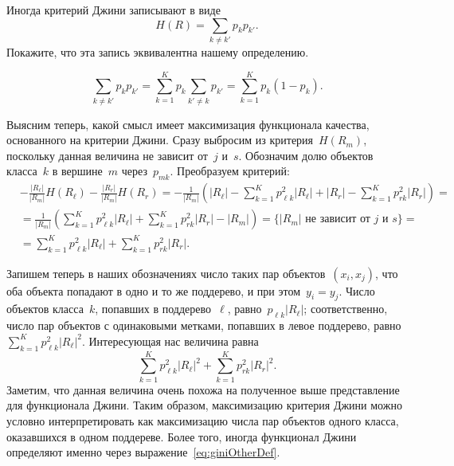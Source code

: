 \documentclass[12pt,a4paper]{article}
\begin{document}
\begin{vkProblem}
    Иногда критерий Джини записывают в виде
    \[
        H(R)
        =
        \sum_{k \neq k'}
            p_{k} p_{k'}.
    \]
    Покажите, что эта запись эквивалентна нашему определению.
\end{vkProblem}

\begin{esSolution}
    \[
        \sum_{k \neq k'} p_{k} p_{k'}
        =
        \sum_{k = 1}^{K} p_{k} \sum_{k' \neq k} p_{k'}
        =
        \sum_{k = 1}^{K} p_{k} (1 - p_{k}).
    \]
\end{esSolution}



Выясним теперь, какой смысл имеет максимизация функционала качества, основанного на критерии Джини.
Сразу выбросим из критерия~$H(R_m)$, поскольку данная величина не зависит от~$j$ и~$s$.
Обозначим долю объектов класса~$k$ в вершине~$m$ через~$p_{mk}$.
Преобразуем критерий:
\begin{align*}
    &- \frac{|R_\ell|}{|R_m|} H(R_\ell) - \frac{|R_r|}{|R_m|} H(R_r)
    =
    - \frac{1}{|R_m|} \left(
        |R_\ell| - \sum_{k = 1}^{K} p_{\ell k}^2 |R_\ell| +
        |R_r| - \sum_{k = 1}^{K} p_{r k}^2 |R_r|
    \right)
    =\\
    &=
    \frac{1}{|R_m|} \left(
        \sum_{k = 1}^{K} p_{\ell k}^2 |R_\ell| +
        \sum_{k = 1}^{K} p_{r k}^2 |R_r|
        - |R_m|
    \right)
    =
    \{\text{$|R_m|$ не зависит от~$j$ и~$s$}\}
    =\\
    &=
    \sum_{k = 1}^{K} p_{\ell k}^2 |R_\ell| +
    \sum_{k = 1}^{K} p_{r k}^2 |R_r|.
\end{align*}

Запишем теперь в наших обозначениях число таких пар объектов~$(x_i, x_j)$,
что оба объекта попадают в одно и то же поддерево, и при этом~$y_i = y_j$.
Число объектов класса~$k$, попавших в поддерево~$\ell$,
равно~$p_{\ell k} |R_\ell|$;
соответственно, число пар объектов с одинаковыми метками, попавших в левое
поддерево, равно~$\sum_{k = 1}^{K} p_{\ell k}^2 |R_\ell|^2$.
Интересующая нас величина равна
\begin{equation}
\label{eq:giniOtherDef}
    \sum_{k = 1}^{K} p_{\ell k}^2 |R_\ell|^2
    +
    \sum_{k = 1}^{K} p_{r k}^2 |R_r|^2.
\end{equation}
Заметим, что данная величина очень похожа на полученное
выше представление для функционала Джини.
Таким образом, максимизацию критерия Джини можно условно
интерпретировать как максимизацию числа пар объектов одного класса,
оказавшихся в одном поддереве.
Более того, иногда функционал Джини определяют именно через выражение~\eqref{eq:giniOtherDef}.
\end{document}
